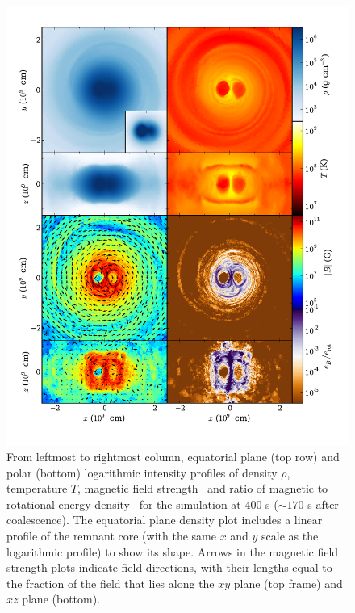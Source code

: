 \begin{figure}
\centering
\includegraphics[angle=0,width=0.9\columnwidth]{chapter4_zhu+15/figures/remnant.pdf}
\caption{From leftmost to rightmost column, equatorial plane (top row) and polar (bottom) logarithmic intensity profiles of density $\rho$, temperature $T$, magnetic field strength \Bmag\ and ratio of magnetic to rotational energy density \eberot\ for the simulation at 400 s ($\sim170$ s after coalescence).  The equatorial plane density plot includes a linear profile of the remnant core (with the same $x$ and $y$ scale as the logarithmic profile) to show its shape.  Arrows in the magnetic field strength plots indicate field directions, with their lengths equal to the fraction of the field that lies along the $xy$ plane (top frame) and $xz$ plane (bottom).}
\label{fig:c4_remnant}
\end{figure}


